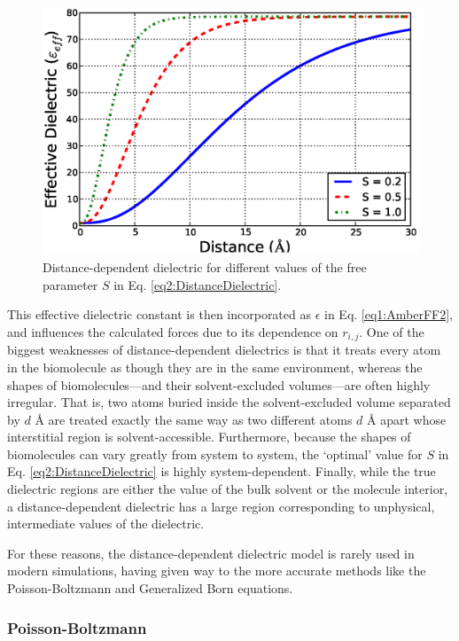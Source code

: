 \begin{figure}
   \includegraphics[width=6.5in]{DistanceDielectric.ps}
   \caption{Distance-dependent dielectric for different values of the free
            parameter $S$ in Eq. \ref{eq2:DistanceDielectric}.}
   \label{fig2:DistanceDielectric}
\end{figure}

This effective dielectric constant is then incorporated as $\epsilon$ in Eq.
\ref{eq1:AmberFF2}, and influences the calculated forces due to its dependence
on $r_{i,j}$. One of the biggest weaknesses of distance-dependent
dielectrics is that it treats every atom in the biomolecule as though they are
in the same environment, whereas the shapes of biomolecules---and their
solvent-excluded volumes---are often highly irregular. That is, two atoms buried
inside the solvent-excluded volume separated by $d$ {\AA} are treated exactly
the same way as two different atoms $d$ {\AA} apart whose interstitial region is
solvent-accessible. Furthermore, because the shapes of biomolecules can vary
greatly from system to system, the `optimal' value for $S$ in Eq.
\ref{eq2:DistanceDielectric} is highly system-dependent. Finally, while the true
dielectric regions are either the value of the bulk solvent or the molecule
interior, a distance-dependent dielectric has a large region corresponding to
unphysical, intermediate values of the dielectric.

For these reasons, the distance-dependent dielectric model is rarely used in
modern simulations, having given way to the more accurate methods like the
Poisson-Boltzmann and Generalized Born equations.

\subsubsection{Poisson-Boltzmann}

